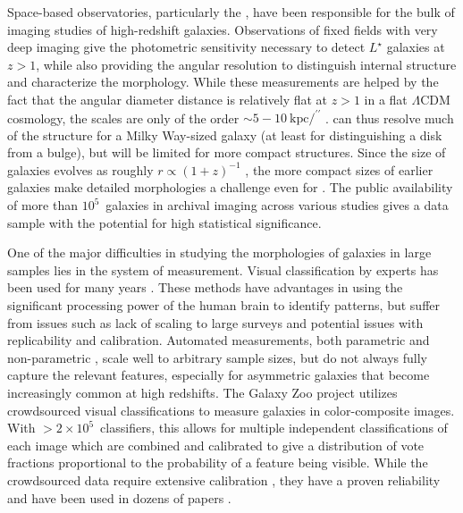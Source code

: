 \documentclass[usenatbib]{mn2e}
\begin{document}
Space-based observatories, particularly the \hubble, have been responsible for the bulk of imaging studies of high-redshift galaxies. Observations of fixed fields with very deep imaging \citep[eg,][]{wil96,gia04,bec06,dav07,sco07,gro11} give the photometric sensitivity necessary to detect $L^\star$ galaxies at $z>1$, while also providing the angular resolution to distinguish internal structure and characterize the morphology. While these measurements are helped by the fact that the angular diameter distance is relatively flat at $z>1$ in a flat $\Lambda$CDM cosmology, the scales are only of the order $\sim5-10~\mathrm{kpc}/^{\prime\prime}$ \citep{wri06}. \hst{} can thus resolve much of the structure for a Milky Way-sized galaxy (at least for distinguishing a disk from a bulge), but will be limited for more compact structures. Since the size of galaxies evolves as roughly $r\propto(1+z)^{-1}$ \citep{law12a}, the more compact sizes of earlier galaxies make detailed morphologies a challenge even for \hst{} \citep{che12}. The public availability of more than $10^5$~galaxies in archival imaging across various studies gives a data sample with the potential for high statistical significance. 

One of the major difficulties in studying the morphologies of galaxies in large samples lies in the system of measurement. Visual classification by experts has been used for many years \citep[eg,][]{hub26,dev59,san61,van76,nai10,bai11,kar15}. These methods have advantages in using the significant processing power of the human brain to identify patterns, but suffer from issues such as lack of scaling to large surveys and potential issues with replicability and calibration. Automated measurements, both parametric \citep{pen02a,sim11,lac12} and non-parametric \citep{con03,lot04,sca07,bam08,fre13}, scale well to arbitrary sample sizes, but do not always fully capture the relevant features, especially for asymmetric galaxies that become increasingly common at high redshifts. The Galaxy Zoo project \citep{lin08,lin11} utilizes crowdsourced visual classifications to measure galaxies in color-composite images. With $>2\times10^5$~classifiers, this allows for multiple independent classifications of each image which are combined and calibrated to give a distribution of vote fractions proportional to the probability of a feature being visible. While the crowdsourced data require extensive calibration \citep{bam09,wil13}, they have a proven reliability and have been used in dozens of papers \citep[eg,][]{lan08,bam09,dar10,mas11c,ski12,sim13,sch14,wil15}. 
\end{document}
